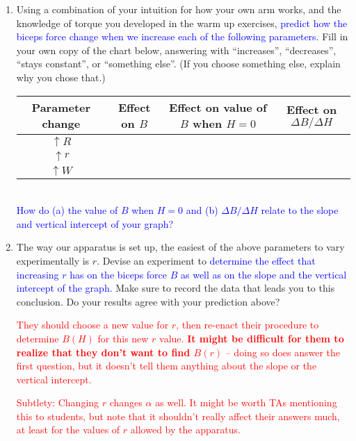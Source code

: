 \documentclass[11pt,letterpaper]{article}
\newcommand{\question}[2][blue]{\textcolor{#1}{#2}}
\newcommand{\answer}[2][red]{\textcolor{#1}{#2}}
\newcommand{\yint}[1][]{vertical intercept\xspace}
\begin{document}
\begin{enumerate}[labproc]
\item
Using a combination of your intuition for how your own arm works,
and the knowledge of torque you developed in the warm up exercises,
\question{predict how the biceps force change when we increase 
each of the following parameters. }
Fill in your own copy of the chart below, 
answering with ``increases'', ``decreases'', 
``stays constant'', or ``something else''.  
(If you choose something else, explain why you chose that.)
\vspace{.5cm}
\\
\begin{tabular}{|c||c|c|c|}
	\hline
	Parameter change & Effect on $B$ 
	& Effect on value of $B$ when $H=0$
	& Effect on $\Delta B/\Delta H$ 
	\\ \hline \hline
	$\uparrow R$ 
	& & & 
	\\ \hline
	$\uparrow r$ 
	& & & \\ \hline
	$\uparrow W$ 
	& & & 
	\\ \hline
\end{tabular}\\

\question{How do (a) the value of $B$ when $H=0$ 
and (b) $\Delta B/\Delta H$ 
relate to the slope and vertical intercept of your graph?}

\item
The way our apparatus is set up, 
the easiest of the above parameters to vary experimentally is $r$.
Devise an experiment to 
\question{determine the effect that increasing $r$
has on the biceps force $B$ as well as 
on the slope and the \yint  of the graph.}
Make sure to record the data that leads you to this conclusion.
Do your results agree with your prediction above?

\answer{They should choose a new value for $r$, then re-enact their procedure
	to determine $B(H)$ for this new $r$ value.  
	{\bf It might be difficult for them
	to realize that they don't want to find $B(r)$ }
	-- doing so does answer the first question, 
	but it doesn't tell them anything about the slope or the \yint.}

\answer{
	Subtlety: 
	Changing $r$ changes $\alpha$ as well.  
	It might be worth TAs mentioning this to students, 
	but note that it shouldn't really affect their answers much,
	at least for the values of $r$ allowed by the apparatus.
}

\end{enumerate}
\end{document}
